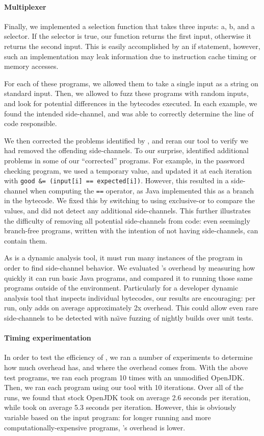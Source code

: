 \paragraph{Multiplexer}
Finally, we implemented a selection function that takes three inputs: a, b, and
a selector. If the selector is true, our function returns the first input,
otherwise it returns the second input. This is easily accomplished by an if
statement, however, such an implementation may leak information due to instruction cache timing or
memory accesses.

\bigskip

For each of these programs, we allowed them to take a single input as a string
on standard input. Then, we allowed \jcupid to fuzz these programs with random
inputs, and look for potential differences in the bytecodes executed. In each
example, we found the intended side-channel, and \jcupid was able to correctly
determine the line of code responsible.

We then corrected the problems identified by \jcupid, and reran our tool to
verify we had removed the offending side-channels. To our surprise, \jcupid
identified additional problems in some of our ``corrected'' programs. For example, in
the password checking program, we used a temporary value, and updated it at each
iteration with \texttt{good \&= (input[i] == expected[i])}. However, this resulted in
a side-channel when computing the \texttt{==} operator, as Java implemented this as a
branch in the bytecode. We fixed this by switching to using exclusive-or to
compare the values, and \jcupid did not detect any additional side-channels. This
further illustrates the difficulty of removing all potential side-channels from
code: even seemingly branch-free programs, written with the intention of not
having side-channels, can contain them.


As \jcupid is a dynamic analysis tool, it must run many instances of the program
in order to find side-channel behavior. We evaluated \jcupid's overhead by
measuring how quickly it can run basic Java programs, and compared it to
running those same programs outside of the \jcupid environment. Particularly for
a developer dynamic analysis tool that inspects individual bytecodes, our
results are encouraging: per run, \jcupid only adds on average approximately 2x
overhead. This could allow even rare side-channels to be detected with
na\"{\i}ve fuzzing of nightly builds over unit tests.

\paragraph{Timing experimentation}
In order to test the efficiency of \jcupid, we ran a number of experiments to
determine how much overhead \jcupid has, and where the overhead comes from.
With the above test programs, we ran each program 10 times with an unmodified
OpenJDK. Then, we ran each program using our tool with 10 iterations. Over all
of the runs, we found that stock OpenJDK took on average 2.6 seconds per
iteration, while \jcupid took on average 5.3 seconds per iteration. However, this
is obviously variable based on the input program: for longer running and more
computationally-expensive programs, \jcupid's overhead is lower.

